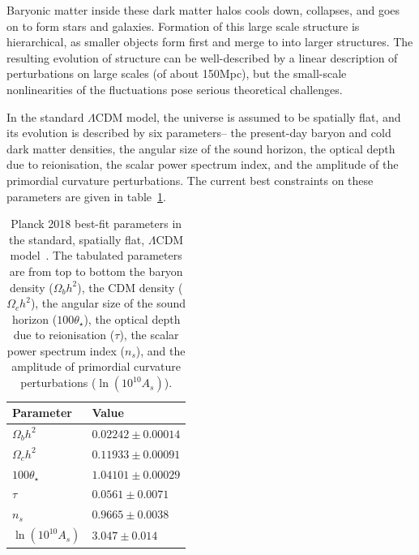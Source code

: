 Baryonic matter inside these dark matter halos cools down, collapses, and goes on to form stars and galaxies. Formation of this large scale structure is hierarchical, as smaller objects form first and merge to into larger structures. The resulting evolution of structure can be well-described by a linear description of perturbations on large scales (of about 150Mpc), but the small-scale nonlinearities of the fluctuations pose serious theoretical challenges.

In the standard $\Lambda$CDM model, the universe is assumed to be spatially flat, and its evolution is described by six parameters-- the present-day baryon and cold dark matter densities, the angular size of the sound horizon, the optical depth due to reionisation, the scalar power spectrum index, and the amplitude of the primordial curvature perturbations. The current best constraints on these parameters are given in table~\ref{tab:planck2018params}.

\begin{table}[ht]
	\centering
\begin{tabular}{ l | l}
	\textbf{Parameter} & \textbf{Value} \\
	\hline
	$\Omega_b h^2$ & $0.02242 \pm 0.00014$ \\
	$\Omega_c h^2$  & $0.11933 \pm 0.00091$ \\
	$100 \theta_\star$ & $1.04101 \pm 0.00029$ \\
	$\tau$  & $0.0561 \pm 0.0071$ \\
	$n_s$  & $0.9665 \pm 0.0038$ \\
	$\ln (10^{10} A_s)$  & $3.047 \pm 0.014$
\end{tabular}
	\caption{Planck 2018 best-fit parameters in the standard, spatially flat, $\Lambda$CDM model~\cite{Aghanim:2018eyx}. The tabulated parameters are from top to bottom the baryon density ($\Omega_b h^2$), the CDM density ($\Omega_c h^2$), the angular size of the sound horizon ($100 \theta_\star$), the optical depth due to reionisation ($\tau$), the scalar power spectrum index ($n_s$), and the amplitude of primordial curvature perturbations ($\ln (10^{10} A_s)$).} \label{tab:planck2018params}
\end{table}

